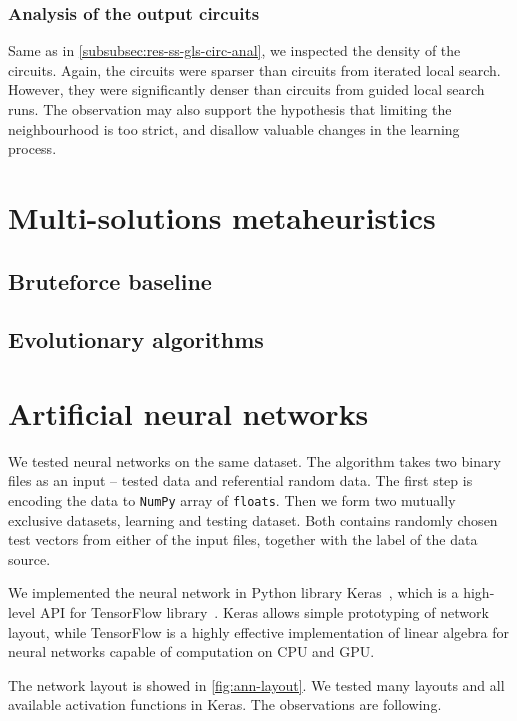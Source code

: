 \documentclass[
  print, %
  Table,   %
  nolof,     %
  nolot,     %
  11pt, %
  oneside  %
]{fithesis3}
\begin{document}
\subsubsection{Analysis of the output circuits}
\label{subsubsec:res-ss-vns-circ-anal}

Same as in \cref{subsubsec:res-ss-gls-circ-anal}, we inspected the density of the circuits. Again, the circuits were sparser than circuits from iterated local search. However, they were significantly denser than circuits from guided local search runs. The observation may also support the hypothesis that limiting the neighbourhood is too strict, and disallow valuable changes in the learning process.

\section{Multi-solutions metaheuristics}
\label{sec:res-ms}
\subsection{Bruteforce baseline}
\label{subsec:res-ms-bruteforce}
\subsection{Evolutionary algorithms}
\label{subsec:res-ms-aco}

\section{Artificial neural networks}
\label{sec:res-ann}

We tested neural networks on the same dataset. The algorithm takes two binary files as an input -- tested data and referential random data. The first step is encoding the data to \texttt{NumPy} array of \texttt{floats}. Then we form two mutually exclusive datasets, learning and testing dataset. Both contains randomly chosen test vectors from either of the input files, together with the label of the data source.

We implemented the neural network in Python library Keras~\cite{chollet2015keras}, which is a high-level API for TensorFlow library~\cite{abadi2016tensorflow}. Keras allows simple prototyping of network layout, while TensorFlow is a highly effective implementation of linear algebra for neural networks capable of computation on CPU and GPU.

The network layout is showed in \cref{fig:ann-layout}. We tested many layouts and all available activation functions in Keras. The observations are following.
\end{document}
